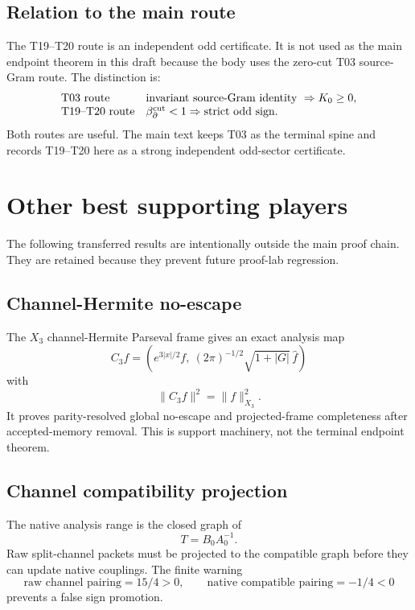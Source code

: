 \documentclass[11pt]{article}
\begin{document}
\subsection{Relation to the main route}

The T19--T20 route is an independent odd certificate.  It is not used as the main endpoint theorem in this draft because the body uses the zero-cut T03 source-Gram route.  The distinction is:
\[
\begin{array}{ll}
\text{T03 route} & \text{invariant source-Gram identity }\Rightarrow K_0\ge0,\\
\text{T19--T20 route} & \beta_{\partial}^{\rm cut}<1 \Rightarrow \text{strict odd sign}.
\end{array}
\]
Both routes are useful.  The main text keeps T03 as the terminal spine and records T19--T20 here as a strong independent odd-sector certificate.

\section{Other best supporting players}

The following transferred results are intentionally outside the main proof chain.  They are retained because they prevent future proof-lab regression.

\subsection{Channel-Hermite no-escape}

The \(X_3\) channel-Hermite Parseval frame gives an exact analysis map
\[
C_3f=\left(e^{3|x|/2}f,\ (2\pi)^{-1/2}\sqrt{1+|G|}\,\widehat f\right)
\]
with
\[
\|C_3f\|^2=\|f\|_{X_3}^2.
\]
It proves parity-resolved global no-escape and projected-frame completeness after accepted-memory removal.  This is support machinery, not the terminal endpoint theorem.

\subsection{Channel compatibility projection}

The native analysis range is the closed graph of
\[
T=B_0A_0^{-1}.
\]
Raw split-channel packets must be projected to the compatible graph before they can update native couplings.  The finite warning
\[
\text{raw channel pairing}=15/4>0,
\qquad
\text{native compatible pairing}=-1/4<0
\]
prevents a false sign promotion.
\end{document}
